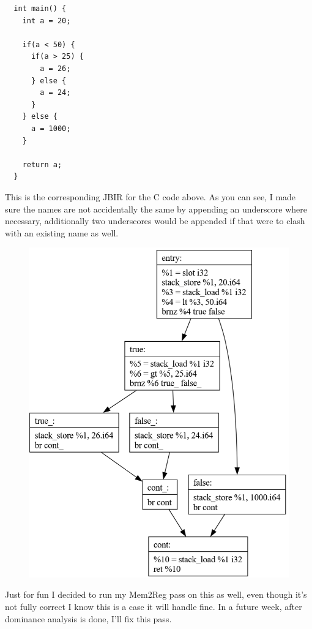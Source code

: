 \documentclass[11pt, a4paper, titlepage]{article}
\begin{document}
\begin{lstlisting}
  int main() {
    int a = 20;
  
    if(a < 50) {
      if(a > 25) {
        a = 26;
      } else {
        a = 24;
      }
    } else {
      a = 1000;
    }
  
    return a;
  }
\end{lstlisting}

This is the corresponding JBIR for the C code above. As you can see, I made sure the names are not accidentally the same by appending an underscore where necessary, additionally two underscores would be appended if that were to clash with an existing name as well.

\begin{figure}[H]
  \centering
  \includegraphics[scale=0.4]{images/i15.png}
\end{figure}

Just for fun I decided to run my Mem2Reg pass on this as well, even though it's not fully correct I know this is a case it will handle fine. In a future week, after dominance analysis is done, I'll fix this pass.
\end{document}
